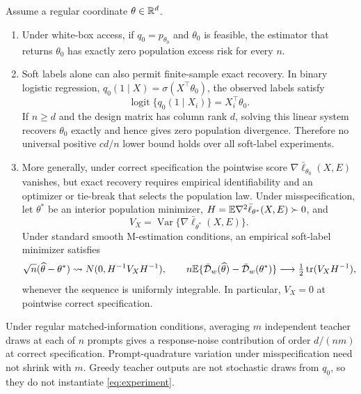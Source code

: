 \begin{proposition}
\label{prop:access}
Assume a regular coordinate \(\theta\in\mathbb R^d\).
\begin{enumerate}[label=(\roman*),leftmargin=*]
    \item Under white-box access, if \(q_0=p_{\theta_0}\) and \(\theta_0\)
    is feasible, the estimator that returns \(\theta_0\) has exactly zero
    population excess risk for every \(n\).
    \item Soft labels alone can also permit finite-sample exact recovery.  In
    binary logistic regression,
    \(q_0(1\mid X)=\sigma(X^\top\theta_0)\), the observed labels satisfy
    \[
      \operatorname{logit}\{q_0(1\mid X_i)\}=X_i^\top\theta_0.
    \]
    If \(n\ge d\) and the design matrix has column rank \(d\), solving this
    linear system recovers \(\theta_0\) exactly and hence gives zero
    population divergence.  Therefore no universal positive \(c d/n\)
    lower bound holds over all soft-label experiments.
    \item More generally, under correct specification the pointwise score
    \(\nabla\bar\ell_{\theta_0}(X,E)\) vanishes, but exact recovery requires
    empirical identifiability and an optimizer or tie-break that selects the
    population law.  Under misspecification, let \(\theta^*\) be an interior
    population minimizer, \(H=\mathbb E\nabla^2\bar\ell_{\theta^*}(X,E)\succ0\), and
    \[
      V_X=\operatorname{Var}\{\nabla\bar\ell_{\theta^*}(X,E)\}.
    \]
    Under standard smooth M-estimation conditions, an empirical soft-label minimizer satisfies
    \[
      \sqrt n(\widehat\theta-\theta^*)\rightsquigarrow
      N(0,H^{-1}V_XH^{-1}),
      \qquad
      n\mathbb E\{\bar{\mathcal D}_w(\widehat\theta)-\bar{\mathcal D}_w(\theta^*)\}
      \longrightarrow \tfrac12\operatorname{tr}(V_XH^{-1}),
    \]
    whenever the sequence is uniformly integrable. In particular, \(V_X=0\)
    at pointwise correct specification.
\end{enumerate}
\end{proposition}

Under regular matched-information conditions, averaging \(m\) independent teacher draws at each of \(n\) prompts gives a response-noise contribution of order \(d/(nm)\) at correct specification. Prompt-quadrature variation under misspecification need not shrink with \(m\). Greedy teacher outputs are not stochastic draws from \(q_0\), so they do not instantiate \cref{eq:experiment}.
